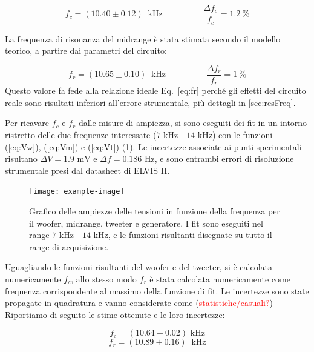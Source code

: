 \documentclass[12pt,italian]{article}
\newcommand{\err}[1]{\textcolor{red}{#1}}
\begin{document}
\begin{equation*}
	f_{c} = (10.40 \pm 0.12)\  \text{ kHz} \hspace{2cm} \frac{\Delta f_{c}}{f_{c}} = 1.2 \ \%
\end{equation*}

La frequenza di risonanza del midrange è stata stimata secondo il modello
teorico, a partire dai parametri del circuito:

\begin{equation*}
	f_{r} = (10.65 \pm 0.10)\  \text{ kHz} \hspace{2cm} \frac{\Delta f_{r}}{f_{r}} = 1 \ \%
\end{equation*}
Questo valore fa fede alla relazione ideale Eq.~\eqref{eq:fr} perché gli effetti del circuito reale sono risultati inferiori
all'errore strumentale, più dettagli in \cref{sec:resFreq}.

Per ricavare $f_{c}$ e $f_{r}$ dalle misure di ampiezza, si sono eseguiti dei
fit in un intorno ristretto delle due frequenze interessate ($ 7 $ kHz - $ 14 $
kHz) con le funzioni (\ref{eq:Vw}), (\ref{eq:Vm}) e (\ref{eq:Vt})
(\cref{fig:amp_sweep}). Le incertezze associate ai punti sperimentali risultano
$ \Delta V = 1.9 \text{ mV}$ e $ \Delta f = 0.186 \text{ Hz} $, e sono entrambi
errori di risoluzione strumentale presi dal datasheet di ELVIS II.

\begin{figure}[h]
	\centering
	\texttt{[image: example-image]}
	\caption{Grafico delle ampiezze delle tensioni in funzione della frequenza per il woofer, midrange, tweeter e generatore. I fit sono eseguiti nel range $7$ kHz - $14$ kHz, e le funzioni risultanti disegnate su tutto il range di acquisizione.}\label{fig:fc_fr}
	\label{fig:amp_sweep}
\end{figure}

Uguagliando le funzioni risultanti del woofer e del tweeter, si è calcolata
numericamente $f_{c}$, allo stesso modo $f_{r}$ è stata calcolata numericamente
come frequenza corrispondente al massimo della funzione di fit. Le incertezze
sono state propagate in quadratura e vanno considerate come
(\err{statistiche/casuali?}) Riportiamo di seguito le stime ottenute e le loro
incertezze:

\begin{equation*}
	f_{c} = (10.64 \pm 0.02) \text{ kHz}
\end{equation*}
\begin{equation*}
	f_{r} = (10.89 \pm 0.16)\  \text{ kHz}
\end{equation*}
\end{document}
